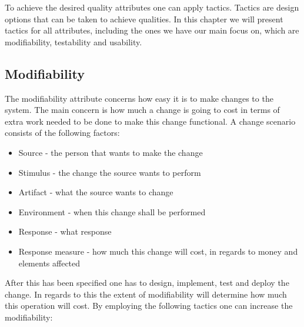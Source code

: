 \label{tactics}
To achieve the desired quality attributes one can apply tactics. Tactics are design options that can be taken to achieve qualities. In this chapter we will present tactics for all attributes, including the ones we have our main focus on, which are modifiability, testability and usability. 

\subsection{Modifiability}
The modifiability attribute concerns how easy it is to make changes to the system. The main concern is how much a change is going to cost in terms of extra work needed to be done to make this change functional. A change scenario consists of the following factors:

\begin{itemize}

	\item Source - the person that wants to make the change
	\item Stimulus - the change the source wants to perform
	\item Artifact - what the source wants to change
	\item Environment - when this change shall be performed
	\item Response - what response
	\item Response measure - how much this change will cost, in regards to money and elements affected
\end{itemize}

After this has been specified one has to design, implement, test and deploy the change. In regards to this the extent of modifiability will determine how much this operation will cost. By employing the following tactics one can increase the modifiability: 

